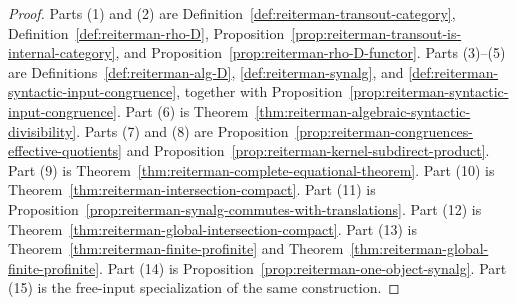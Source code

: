 \begin{proof}
Parts (1) and (2) are
Definition~\ref{def:reiterman-transout-category},
Definition~\ref{def:reiterman-rho-D},
Proposition~\ref{prop:reiterman-transout-is-internal-category}, and
Proposition~\ref{prop:reiterman-rho-D-functor}.
Parts (3)--(5) are
Definitions~\ref{def:reiterman-alg-D},
\ref{def:reiterman-synalg}, and
\ref{def:reiterman-syntactic-input-congruence}, together with
Proposition~\ref{prop:reiterman-syntactic-input-congruence}.
Part (6) is
Theorem~\ref{thm:reiterman-algebraic-syntactic-divisibility}.
Parts (7) and (8) are
Proposition~\ref{prop:reiterman-congruences-effective-quotients} and
Proposition~\ref{prop:reiterman-kernel-subdirect-product}.
Part (9) is
Theorem~\ref{thm:reiterman-complete-equational-theorem}.
Part (10) is
Theorem~\ref{thm:reiterman-intersection-compact}.
Part (11) is
Proposition~\ref{prop:reiterman-synalg-commutes-with-translations}.
Part (12) is
Theorem~\ref{thm:reiterman-global-intersection-compact}.
Part (13) is
Theorem~\ref{thm:reiterman-finite-profinite} and
Theorem~\ref{thm:reiterman-global-finite-profinite}.
Part (14) is
Proposition~\ref{prop:reiterman-one-object-synalg}.
Part (15) is the free-input specialization of the same construction.
\end{proof}